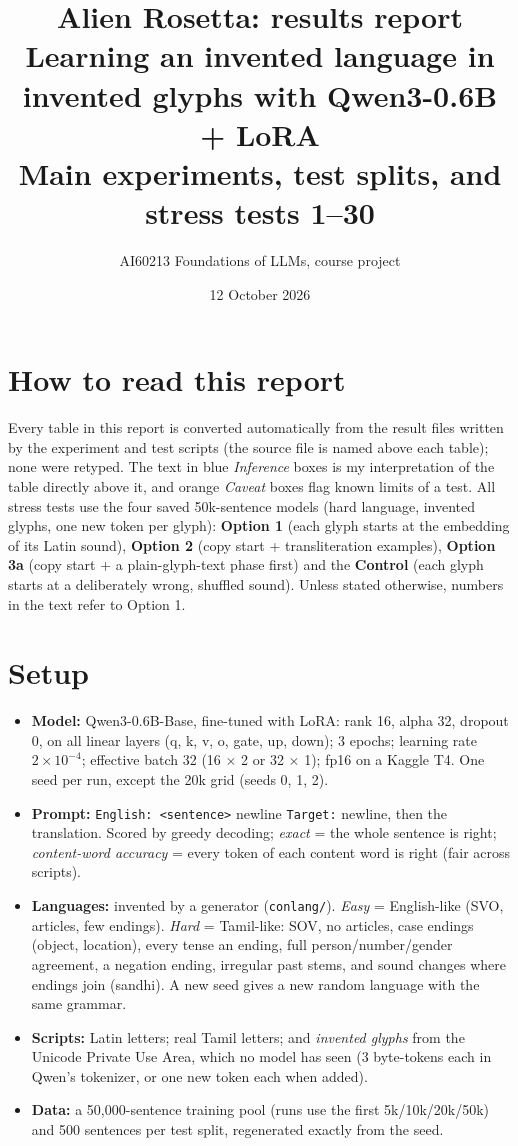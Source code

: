 \documentclass[10pt,a4paper,oneside]{article}
\title{\textbf{Alien Rosetta: results report}\\[0.3em]\large Learning an invented language in invented glyphs with Qwen3-0.6B + LoRA\\[0.2em]
\normalsize Main experiments, test splits, and stress tests 1--30}
\author{AI60213 Foundations of LLMs, course project}
\date{12 October 2026}
\begin{document}
\maketitle
\tableofcontents
\newpage


\section*{How to read this report}
Every table in this report is converted automatically from the result files written by the experiment and test
scripts (the source file is named above each table); none were retyped. The text in blue \emph{Inference} boxes is
my interpretation of the table directly above it, and orange \emph{Caveat} boxes flag known limits of a test. All
stress tests use the four saved 50k-sentence models (hard language, invented glyphs, one new token per glyph):
\textbf{Option 1} (each glyph starts at the embedding of its Latin sound), \textbf{Option 2} (copy start +
transliteration examples), \textbf{Option 3a} (copy start + a plain-glyph-text phase first) and the
\textbf{Control} (each glyph starts at a deliberately wrong, shuffled sound). Unless stated otherwise, numbers in
the text refer to Option 1.

\section{Setup}

\begin{itemize}
\item \textbf{Model:} Qwen3-0.6B-Base, fine-tuned with LoRA: rank 16, alpha 32, dropout 0, on all linear layers
(q, k, v, o, gate, up, down); 3 epochs; learning rate $2\times10^{-4}$; effective batch 32 (16 $\times$ 2 or
32 $\times$ 1); fp16 on a Kaggle T4. One seed per run, except the 20k grid (seeds 0, 1, 2).
\item \textbf{Prompt:} \texttt{English: <sentence>} newline \texttt{Target:} newline, then the translation. Scored by
greedy decoding; \emph{exact} = the whole sentence is right; \emph{content-word accuracy} = every token of each
content word is right (fair across scripts).
\item \textbf{Languages:} invented by a generator (\texttt{conlang/}). \emph{Easy} = English-like (SVO, articles, few
endings). \emph{Hard} = Tamil-like: SOV, no articles, case endings (object, location), every tense an ending, full
person/number/gender agreement, a negation ending, irregular past stems, and sound changes where endings join
(sandhi). A new seed gives a new random language with the same grammar.
\item \textbf{Scripts:} Latin letters; real Tamil letters; and \emph{invented glyphs} from the Unicode Private Use
Area, which no model has seen (3 byte-tokens each in Qwen's tokenizer, or one new token each when added).
\item \textbf{Data:} a 50,000-sentence training pool (runs use the first 5k/10k/20k/50k) and 500 sentences per test
split, regenerated exactly from the seed.
\end{itemize}
\end{document}
